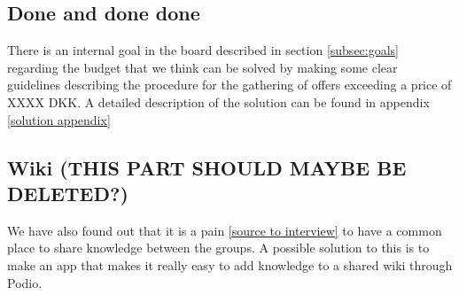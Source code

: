 \subsection{Done and done done}
There is an internal goal in the board described in section \ref{subsec:goals} regarding the
budget that we think can be solved by making some clear guidelines describing
the procedure for the gathering of offers exceeding a price of XXXX DKK. A
detailed description of the solution can be found in appendix \ref{solution
appendix}

\subsection{Wiki (THIS PART SHOULD MAYBE BE DELETED?)}
We have also found out that it is a pain \ref{source to interview} to have a
common place to share knowledge between the groups. A possible solution to this
is to make an app that makes it really easy to add knowledge to a shared wiki
through Podio.

